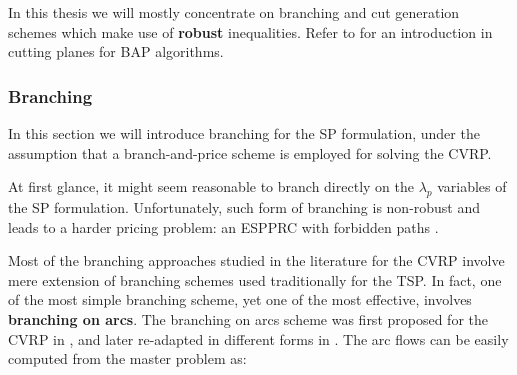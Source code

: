 In this thesis
we will mostly concentrate on branching and cut generation schemes
which make use of \textbf{robust} inequalities.
Refer to \textcite{desaulniers2011} for an introduction in cutting planes for BAP algorithms.


\begin{comment}
When a violated inequality in the two/three-index formulation is found, it is decomposed at runtime and introduced in the master problem.
\end{comment}

\begin{comment}
\cite{jepsen2011}
The other method is enumeration which has proven to be very successful
for both cvrp[1] and vrptw[3]. In enumeration an upper bound U B and
a lower bound LB are used. From reduced cost fixing of a binary variable
it is know that any non basic column with a reduced cost strictly greater
than the gap ub − lb can not be part of an integer solution which is an
improvement of the current solution. This complete set of columns can be
found by solving an espprc using the dominance rule in proposition 5 and
bounding functions. Once we have added the columns with reduced cost less
than or equal to the gap the resulting problem can be solved as an integer
optimization problem.
\end{comment}



\subsubsection{Branching}
\label{sec:bap-branching}

In this section we will introduce branching for the SP formulation,
under the assumption that a branch-and-price scheme is employed
for solving the CVRP.

At first glance,
it might seem reasonable to branch directly on the $\lambda_p$ variables of the SP formulation.
Unfortunately, such form of branching is non-robust
and leads to a harder pricing problem: an ESPPRC with forbidden paths \parencite{villeneuve2005}.

Most of the branching approaches studied in the literature for the CVRP involve
mere extension of branching schemes used traditionally for the TSP.
In fact, one of the most simple branching scheme,
yet one of the most effective,
involves \textbf{branching on arcs}.
The branching on arcs scheme was first proposed for the CVRP in \textcite{christofides1969a},
and later re-adapted in different forms in \textcite{fisher1994a, miller1995}.
The arc flows can be easily computed from the master problem as:

